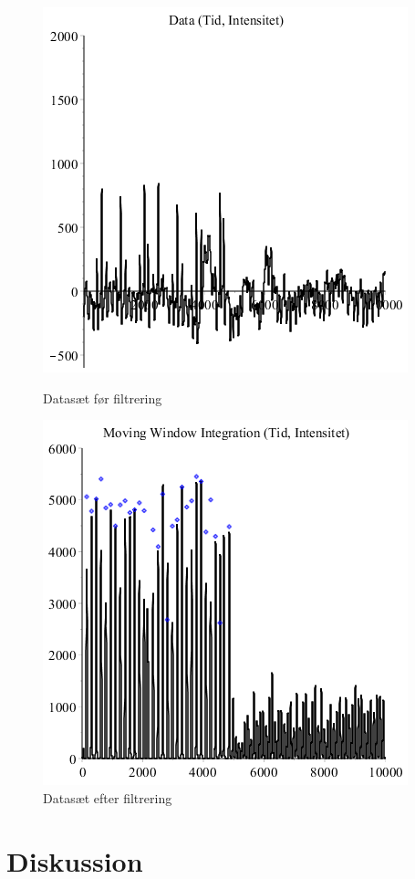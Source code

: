 \documentclass{article}
\begin{document}
\begin{figure}[h]
	\begin{minipage}{.5\linewidth}
		\includegraphics[scale=0.4]{Filter0.png}	
		\caption{Datasæt før filtrering}
	\end{minipage}%
	\begin{minipage}{.5\linewidth}
		\includegraphics[scale=0.4]{Filter5Peaks.png}	
		\caption{Datasæt efter filtrering}
	\end{minipage}
\end{figure}


\section{Diskussion}
\end{document}
